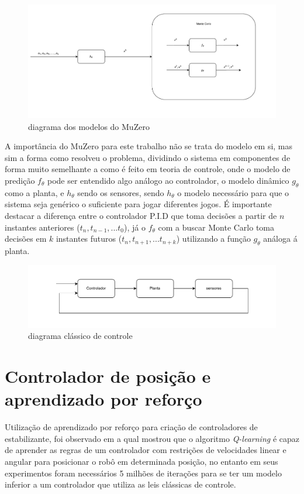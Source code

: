 \begin{figure}[H]
    \centering
    \includegraphics[scale=0.4]{figuras/muzero.pdf}
    \caption{diagrama dos modelos do MuZero}
\end{figure}

A importância do MuZero para este trabalho não se trata do modelo em si,
mas sim a forma como resolveu o problema, dividindo o sistema em componentes
de forma muito semelhante a como é feito em teoria de controle, onde
o modelo de predição  $f_{\theta}$ pode ser entendido algo
análogo ao controlador, o  modelo dinâmico $g_{\theta}$ como a planta,
e $h_{\theta}$ sendo os sensores, sendo $h_{\theta}$ o modelo
necessário  para que o sistema seja genérico o suficiente para jogar
diferentes jogos. É importante destacar a diferença entre o controlador P.I.D
que toma decisões a partir de $n$ instantes anteriores ($t_n,t_{n-1},...t_{0}$),
já o $f_{\theta}$
com a buscar Monte Carlo toma decisões em $k$ instantes futuros ($t_n,t_{n+1},...t_{n+k}$)
utilizando a função $g_{\theta}$ análoga á planta.

\begin{figure}[H]
    \centering
    \includegraphics[scale=0.6]{figuras/sistema_classico_controle.pdf}
    \caption{diagrama clássico de controle}
\end{figure}

\section{Controlador de posição e aprendizado por reforço }
\label{sec:controlador:posicao:aprendizado:reforco}
Utilização de aprendizado por reforço para criação de controladores
de estabilizante, foi observado em \cite{farias2020position}
a qual mostrou que o algoritmo \textit{Q-learning} é capaz de aprender
as regras de um controlador com restrições de velocidades linear e angular
para  posicionar o robô em determinada posição, no entanto em seus
experimentos foram necessários 5 milhões de iterações para se ter um modelo
inferior a um controlador que utiliza as leis clássicas de controle.

